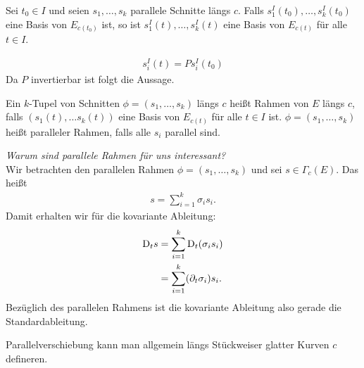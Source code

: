 \begin{lem}
\label{lem:BasisVB}
Sei $t_0 \in I$ und seien $s_1, \dots, s_k$ parallele Schnitte längs $c$.
Falls $s^I_1 (t_0), \dots, s^I_k (t_0)$ eine Basis von $E_{c(t_0)}$ ist, so ist $s^I_1 (t), \dots, s^I_k (t)$ eine Basis von $E_{c(t)}$ für alle $t \in I$.
\end{lem}
\begin{bew}
\begin{align}
s^I_i (t) = Ps^I_i (t_0)
\end{align}
Da $P$ invertierbar ist folgt die Aussage.%
\end{bew}
\begin{defs}
Ein $k$-Tupel von Schnitten $\phi = (s_1, \dots, s_k)$ längs $c$ heißt Rahmen von $E$ längs $c$, falls $(s_1(t), \dots s_k(t))$ eine Basis von $E_{c(t)}$ für alle $t \in I$ ist.
$\phi = (s_1, \dots, s_k)$ heißt paralleler Rahmen, falls alle $s_i$ parallel sind.
\end{defs}
\textit{Warum sind parallele Rahmen für uns interessant?}\\
Wir betrachten den parallelen Rahmen $\phi = (s_1, \dots, s_k)$ und sei $s \in \Gamma_c (E)$.
Das heißt 
\begin{align}
s= \sum^{k}_{i=1} \sigma_i s_i.
\end{align}
Damit erhalten wir für die kovariante Ableitung:
\begin{align}
\mathrm{D}_t s &= \sum^{k}_{i=1} \mathrm{D}_t (\sigma_i s_i)\\
&= \sum^{k}_{i=1} (\partial_t \sigma_i) s_i. 
\end{align}
Bezüglich des parallelen Rahmens ist die kovariante Ableitung also gerade die Standardableitung.
\begin{bem}
Parallelverschiebung kann man allgemein längs Stückweiser glatter Kurven $c$ defineren.
\end{bem}


